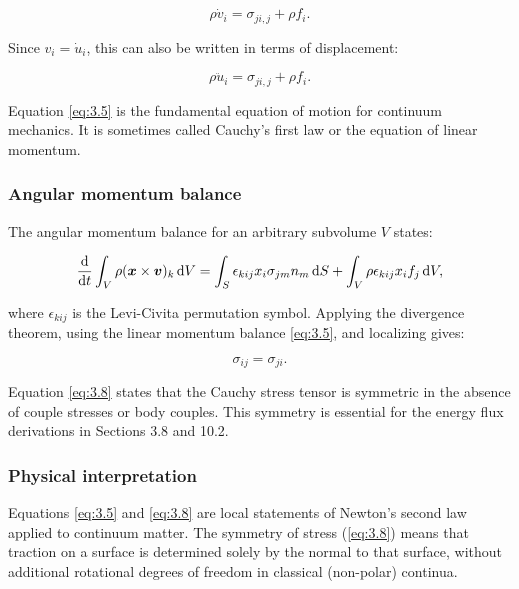 \begin{equation}
\rho \dot{v}_i = \sigma_{ji,j} + \rho f_i.
\label{eq:3.5}
\end{equation}

Since $v_i = \dot{u}_i$, this can also be written in terms of displacement:

\begin{equation}
\rho \ddot{u}_i = \sigma_{ji,j} + \rho f_i.
\label{eq:3.6}
\end{equation}

Equation \eqref{eq:3.5} is the fundamental equation of motion for continuum mechanics. It is sometimes called Cauchy's first law or the equation of linear momentum.

\subsubsection{Angular momentum balance}

The angular momentum balance for an arbitrary subvolume $V$ states:

\begin{equation}
\frac{\mathrm{d}}{\mathrm{d} t} \int_V \rho (\boldsymbol{x} \times \boldsymbol{v})_k \, \mathrm{d} V
=
\int_S \epsilon_{kij} x_i \sigma_{jm} n_m \, \mathrm{d} S
+
\int_V \rho \epsilon_{kij} x_i f_j \, \mathrm{d} V,
\label{eq:3.7}
\end{equation}

where $\epsilon_{kij}$ is the Levi-Civita permutation symbol. Applying the divergence theorem, using the linear momentum balance \eqref{eq:3.5}, and localizing gives:

\begin{equation}
\sigma_{ij} = \sigma_{ji}.
\label{eq:3.8}
\end{equation}

Equation \eqref{eq:3.8} states that the Cauchy stress tensor is symmetric in the absence of couple stresses or body couples. This symmetry is essential for the energy flux derivations in Sections 3.8 and 10.2.

\subsubsection{Physical interpretation}
Equations \eqref{eq:3.5} and \eqref{eq:3.8} are local statements of Newton's second law applied to continuum matter. The symmetry of stress (\eqref{eq:3.8}) means that traction on a surface is determined solely by the normal to that surface, without additional rotational degrees of freedom in classical (non-polar) continua.

